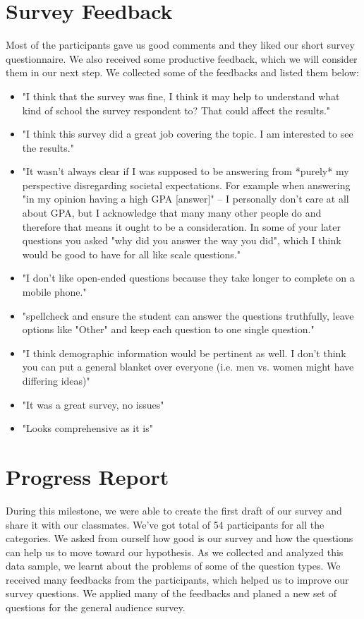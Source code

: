 \documentclass{sigchi}
\begin{document}
\section{Survey Feedback}
Most of the participants gave us good comments and they liked our short survey questionnaire. We also received some productive feedback, which we will consider them in our next step. We collected some of the feedbacks and listed them below:
\begin{itemize}
	\item "I think that the survey was fine, I think it may help to understand what kind of school the survey respondent to? That could affect the results."
	\item "I think this survey did a great job covering the topic. I am interested to see the results."
	\item "It wasn't always clear if I was supposed to be answering from *purely* my perspective disregarding societal expectations. For example when answering "in my opinion having a high GPA [answer]" -- I personally don't care at all about GPA, but I acknowledge that many many other people do and therefore that means it ought to be a consideration. In some of your later questions you asked "why did you answer the way you did", which I think would be good to have for all like scale questions."
	\item "I don't like open-ended questions because they take longer to complete on a mobile phone."
	\item "spellcheck and ensure the student can answer the questions truthfully, leave options like "Other" and keep each question to one single question."
	\item "I think demographic information would be pertinent as well. I don't think you can put a general blanket over everyone (i.e. men vs. women might have differing ideas)"
	\item "It was a great survey, no issues"
	\item "Looks comprehensive as it is"
\end{itemize}


\section{Progress Report}
During this milestone, we were able to create the first draft of our survey and share it with our classmates. We've got total of 54 participants for all the categories. We asked from ourself how good is our survey and how the questions can help us to move toward our hypothesis. As we collected and analyzed this data sample, we learnt about the problems of some of the question types. 
We received many feedbacks from the participants, which helped us to improve our survey questions. We applied many of the feedbacks and planed a new set of questions for the general audience survey. 
\end{document}
